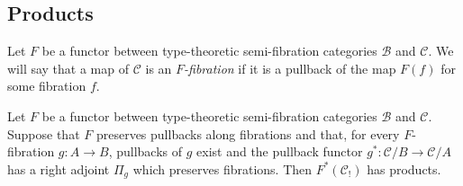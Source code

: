 \documentclass[reqno]{amsart}
\theoremstyle{definition}
\theoremstyle{remark}
\newcommand{\scat}[1]{\mathcal{#1}}
\numberwithin{figure}{section}
\begin{document}
\subsection{Products}

Let $F$ be a functor between type-theoretic semi-fibration categories $\scat{B}$ and $\scat{C}$.
We will say that a map of $\scat{C}$ is an \emph{$F$-fibration} if it is a pullback of the map $F(f)$ for some fibration $f$.

\begin{prop}
Let $F$ be a functor between type-theoretic semi-fibration categories $\scat{B}$ and $\scat{C}$.
Suppose that $F$ preserves pullbacks along fibrations and that, for every $F$-fibration $g : A \to B$, pullbacks of $g$ exist and the pullback functor $g^* : \scat{C}/B \to \scat{C}/A$ has a right adjoint $\Pi_g$ which preserves fibrations.
Then $F^*(\scat{C}_!)$ has products.
\end{prop}
\end{document}
